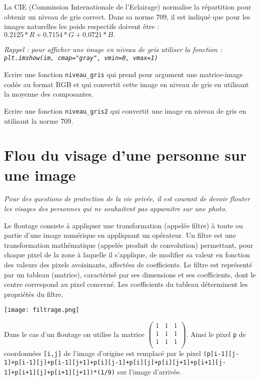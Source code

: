 La CIE (Commission Internationale de l’Eclairage) normalise la répartition pour obtenir un niveau de gris correct. Dans sa norme 709, il est indiqué que pour les images naturelles les poids respectifs doivent être : $0.2125 * R + 0.7154 * G + 0.0721 * B.$

\textit{Rappel : pour afficher une image en niveau de gris utiliser la fonction : \texttt{plt.imshow(im, cmap="gray", vmin=0, vmax=1)}}

\begin{question}
Ecrire une fonction \texttt{niveau\_gris} qui prend pour argument une matrice-image codée au format RGB et qui convertit cette image en niveau de gris en utilisant la moyenne des composantes.
\end{question}

\begin{question} %
Ecrire une fonction \texttt{niveau\_gris2} qui convertit une image en niveau de gris en utilisant la norme 709.
\end{question}





\section*{Flou du visage d'une personne sur une image}


\textit{Pour des questions de protection de la vie privée, il est courant de devoir flouter les visages des personnes qui ne souhaitent pas apparaitre sur une photo. }

Le floutage consiste à appliquer une transformation (appelée filtre) à toute ou partie d’une image numérique en  appliquant un opérateur.  Un filtre est une transformation mathématique (appelée produit de convolution) permettant, pour chaque pixel  de la zone à laquelle il s’applique, de modifier sa valeur en fonction des valeurs des pixels avoisinants, affectées de coefficients. 
 Le filtre est représenté par un tableau (matrice), caractérisé par ses dimensions et ses coefficients, dont le centre
 correspond au pixel concerné. Les coefficients du tableau déterminent les propriétés du filtre.

\begin{marginfigure}%
\texttt{[image: filtrage.png]}
\end{marginfigure}

Dans le cas d'un floutage on utilise la matrice $\begin{pmatrix}  1 &  1 & 1 \\1 &  1 & 1 \\1 &  1 & 1 \\\end{pmatrix}$. 
Ainsi le pixel \texttt{p} de coordonnées \texttt{[i,j]} de l'image d'origine est remplacé par le pixel \lstinline{(p[i-1][j-1]+p[i-1][j]+p[i-1][j+1]+p[i][j-1]+p[i][j]+p[i][j+1]+p[i+1][j-1]+p[i+1][j]+p[i+1][j+1])*(1/9)} sur l'image d'arrivée.


